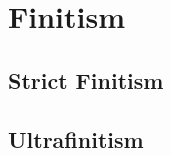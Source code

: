 \section{Finitism}\label{sec:finitism}

\subsection{Strict Finitism}\label{sec:strict_finitism}

\subsection{Ultrafinitism}\label{sec:ultrafinitism}
